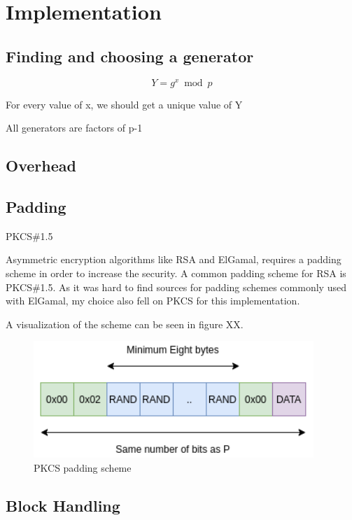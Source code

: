 \documentclass{article}
\begin{document}
\section{Implementation}
\subsection{Finding and choosing a generator}

\begin{equation}
Y = g^{x} \bmod p
\end{equation}

	For every value of x, we should get a unique value of Y

	All generators are factors of p-1


\subsection{Overhead}

\subsection{Padding}
	PKCS\#1.5

Asymmetric encryption algorithms like RSA and ElGamal, requires a padding scheme in order to increase the security. A common padding scheme for RSA is PKCS\#1.5. As it was hard to find sources for padding schemes commonly used with ElGamal, my choice also fell on PKCS for this implementation. 


A visualization of the scheme can be seen in figure XX.  


\begin{figure}[H]
 \centering
  \includegraphics[width=300pt]{img/padding.png}
 \caption{PKCS padding scheme}
 \end{figure}

\subsection{Block Handling}
\end{document}
